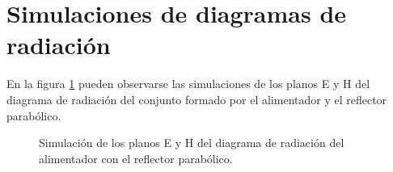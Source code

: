 \section{Simulaciones de diagramas de radiación}
\label{sec_resultados_sim_dia_rad}

En la figura \ref{grup_fig_resultados:4} pueden observarse las simulaciones de los planos E y H del diagrama de radiación del conjunto formado por el alimentador y el reflector parabólico.
\begin{figure} [H]
\centering 
{}
\hspace{5mm}
\caption{Simulación de los planos E y H del diagrama de radiación del alimentador con el reflector parabólico.}
\label{grup_fig_resultados:4}
\end{figure}
